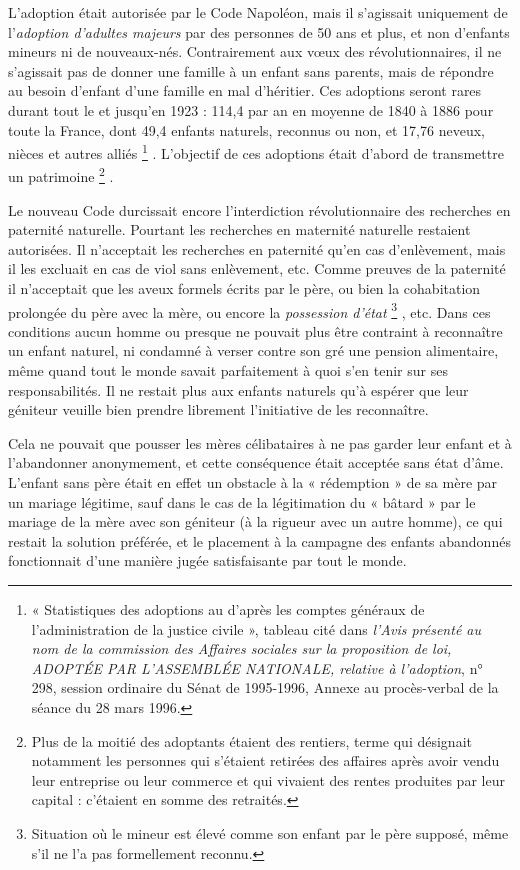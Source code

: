  L'adoption était autorisée par le Code Napoléon, mais il s'agissait uniquement de l'\emph{adoption d'adultes majeurs} par des personnes de 50 ans et plus, et non d'enfants mineurs ni de nouveaux-nés. Contrairement aux vœux des révolutionnaires, il ne s'agissait pas de donner une famille à un enfant sans parents, mais de répondre au besoin d'enfant d'une famille en mal d'héritier. Ces adoptions seront rares durant tout le  et jusqu'en 1923 : 114,4 par an en moyenne de 1840 à 1886 pour toute la France, dont 49,4 enfants naturels, reconnus ou non, et 17,76 neveux, nièces et autres alliés%
\footnote{« Statistiques des adoptions au  d'après les comptes généraux de l'administration de la justice civile », tableau cité dans \emph{l'Avis présenté au nom de la commission des Affaires sociales sur la proposition de loi, ADOPTÉE PAR L'ASSEMBLÉE NATIONALE, relative à l'adoption}, n° 298, session ordinaire du Sénat de 1995-1996, Annexe au procès-verbal de la séance du 28 mars 1996.}%
. L'objectif de ces adoptions était d'abord de transmettre un patrimoine%
\footnote{Plus de la moitié des adoptants étaient des rentiers, terme qui désignait notamment les personnes qui s'étaient retirées des affaires après avoir vendu leur entreprise ou leur commerce et qui vivaient des rentes produites par leur capital : c'étaient en somme des retraités.}%
. 

 Le nouveau Code durcissait encore l'interdiction révolutionnaire des recherches en paternité naturelle. Pourtant les recherches en maternité naturelle restaient autorisées. Il n'acceptait les recherches en paternité qu'en cas d'enlèvement, mais il les excluait en cas de viol sans enlèvement, etc. Comme preuves de la paternité il n'acceptait que les aveux formels écrits par le père, ou bien la cohabitation prolongée du père avec la mère, ou encore la \emph{possession d'état}%
\footnote{Situation où le mineur est élevé comme son enfant par le père supposé, même s'il ne l'a pas formellement reconnu.}%
, etc. Dans ces conditions aucun homme ou presque ne pouvait plus être contraint à reconnaître un enfant naturel, ni condamné à verser contre son gré une pension alimentaire, même quand tout le monde savait parfaitement à quoi s'en tenir sur ses responsabilités. Il ne restait plus aux enfants naturels qu'à espérer que leur géniteur veuille bien prendre librement l'initiative de les reconnaître. 

 Cela ne pouvait que pousser les mères célibataires à ne pas garder leur enfant et à l'abandonner anonymement, et cette conséquence était acceptée sans état d'âme. L'enfant sans père était en effet un obstacle à la « rédemption » de sa mère par un mariage légitime, sauf dans le cas de la légitimation du « bâtard » par le mariage de la mère avec son géniteur (à la rigueur avec un autre homme), ce qui restait la solution préférée, et le placement à la campagne des enfants abandonnés fonctionnait d'une manière jugée satisfaisante par tout le monde. 


